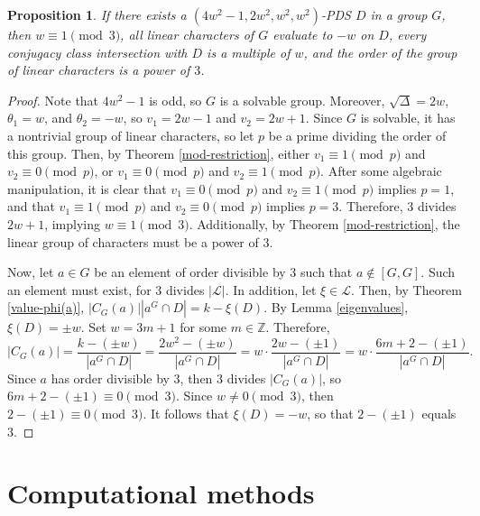 \documentclass[12pt]{amsproc} %
\newtheorem{prop}[thm]{Proposition}
\theoremstyle{definition}\newtheorem{defn}[thm]{Definition}
\theoremstyle{definition}\newtheorem{rem}[thm]{Remark}
\theoremstyle{definition}\newtheorem{ex}[thm]{Example}
\newcommand{\Z}{\mathbb{Z}}
\begin{document}
\begin{prop}\label{DS-restriction}
If there exists a $(4w^2 - 1, 2w^2, w^2, w^2)$-PDS $D$ in a group $G$, then $w \equiv 1 \pmod 3$, all linear characters of $G$ evaluate to $-w$ on $D$, every conjugacy class intersection with $D$ is a multiple of $w$, and the order of the group of linear characters is a power of $3$.
\end{prop}
	\begin{proof}
	Note that $4w^2-1$ is odd, so $G$ is a solvable group. Moreover, $\sqrt{\Delta} = 2w$, $\theta_1 = w$, and $\theta_2 = -w$, so $v_1 = 2w-1$ and $v_2 = 2w+1$. Since $G$ is solvable, it has a nontrivial group of linear characters, so let $p$ be a prime dividing the order of this group. Then, by Theorem \ref{mod-restriction}, either $v_1 \equiv 1 \pmod p$ and $v_2 \equiv 0 \pmod p$, or $v_1 \equiv 0 \pmod p$ and $v_2 \equiv 1 \pmod p$. After some algebraic manipulation, it is clear that $v_1 \equiv 0 \pmod p$ and $v_2 \equiv 1 \pmod p$ implies $p=1$, and that $v_1 \equiv 1 \pmod p$ and $v_2 \equiv 0 \pmod p$ implies $p=3$. Therefore, $3$ divides $2w+1$, implying $w \equiv 1 \pmod 3$. Additionally, by Theorem \ref{mod-restriction}, the linear group of characters must be a power of $3$.
	
	Now, let $a \in G$ be an element of order divisible by $3$ such that $a \not\in [G,G]$. Such an element must exist, for $3$ divides $|\mathcal{L}|$. In addition, let $\xi \in \mathcal{L}$. Then, by Theorem \ref{value-phi(a)}, $|C_G(a)||a^G\cap D| = k - \xi(D)$. By Lemma \ref{eigenvalues}, $\xi(D) = \pm w$. Set $w = 3m+1$ for some $m \in \Z$. Therefore, 
		\begin{equation*}
		|C_G(a)| = \frac{k - (\pm w)}{|a^G\cap D|} = \frac{2w^2 - (\pm w)}{|a^G\cap D|} = w\cdot\frac{2w - (\pm 1)}{|a^G\cap D|} = w\cdot \frac{6m + 2 - (\pm 1)}{|a^G\cap D|}.
		\end{equation*}
	Since $a$ has order divisible by $3$, then $3$ divides $|C_G(a)|$, so $6m + 2 - (\pm 1) \equiv 0 \pmod 3$. Since $w\neq 0\pmod 3$, then $2 - (\pm 1) \equiv 0 \pmod 3$. It follows that $\xi(D) = -w$, so that $2 - (\pm 1)$ equals $3$.
	\end{proof}



\section{Computational methods}
\label{sect:comp}
\end{document}
